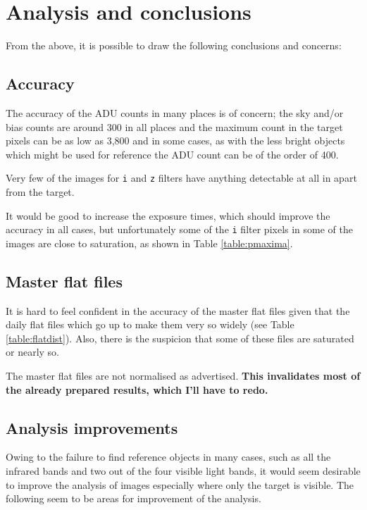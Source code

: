 \section{Analysis and conclusions}
\protect\label{section:analysis}

From the above, it is possible to draw the following conclusions and concerns:

\subsection{Accuracy}
The accuracy of the ADU counts in many places is of concern; the sky and/or bias
counts are around 300 in all places and the maximum count in the target pixels
can be as low as 3,800 and in some cases, as with the less bright objects which
might be used for reference the ADU count can be of the order of 400.

Very few of the images for \texttt{i} and \texttt{z} filters have anything
detectable at all in apart from the target.

It would be good to increase the exposure times, which should improve the
accuracy in all cases, but unfortunately some of the \texttt{i} filter pixels in
some of the images are close to saturation, as shown in Table
\ref{table:pmaxima}.

\subsection{Master flat files}
It is hard to feel confident in the accuracy of the master flat files given that
the daily flat files which go up to make them very so widely (see Table
\ref{table:flatdist}). Also, there is the suspicion that some of these files are
saturated or nearly so.

The master flat files are not normalised as advertised. \textbf{This
invalidates most of the already prepared results, which I'll have to redo.}

\subsection{Analysis improvements}
\protect\label{section:analimprove}

Owing to the failure to find reference objects in many cases, such as all the infrared bands and two out of the four
visible light bands, it would seem desirable to improve the analysis of images especially where only the target is
visible. The following seem to be areas for improvement of the analysis.

